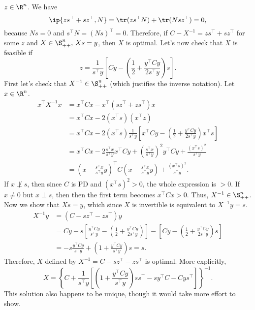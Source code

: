 \documentclass[../borwein-lewis_notes.tex]{subfiles}
\begin{document}
\begin{enumerate}[(a)]
{$z\in\R^n$. We have 
\begin{equation*}
\ip{zs^\top + sz^\top, N} = \tr(zs^\top N) + \tr(Nsz^\top) = 0,
\end{equation*}
because $Ns=0$ and $s^\top N = (Ns)^\top = 0$. Therefore, if 
$C-X^{-1} = zs^\top + sz^\top$ for some $z$ and $X\in\S_{++}^n,\,Xs=y$,
 then 
$X$ is optimal. Let's now check that $X$ is feasible if
\begin{equation*}
z = \frac{1}{s^\top y}\left[Cy - \left(\frac{1}{2}+\frac{y^\top Cy}{
2s^\top y}\right)s\right].
\end{equation*}
First let's check that $X^{-1}\in\S_{++}^n$ (which justifies the inverse
notation). Let $x\in\R^n$.
\begin{align*}
x^\top X^{-1} x &= x^\top Cx - x^\top(sz^\top +zs^\top)x \\
&= x^\top Cx - 2(x^\top s)(x^\top z)\\
&= x^\top Cx - 2(x^\top s)\frac{1}{s^\top y}\left[x^\top Cy - 
\left(\frac{1}{2}+\frac{y^\top Cy}{2s^\top y}\right)x^\top s\right]\\
&= x^\top Cx - 2\frac{s^\top x}{s^\top y} x^\top Cy + \left(\frac{s^\top x}{
s^\top y}\right)^2 y^\top C y  + \frac{(x^\top s)^2}{s^\top y} \\
&= \left(x-\frac{s^\top x}{s^\top y} y\right)^\top C
\left(x-\frac{s^\top x}{s^\top y} y\right) + \frac{(x^\top s)^2}{s^\top y}.
\end{align*}
If $x \not\perp s$, then since $C$ is PD and $(x^\top s)^2>0$, the 
whole expression is $>0$. If $x\neq 0$ but $x\perp s$, then then 
the first term becomes $x^\top C x > 0$. Thus, $X^{-1}\in\S_{++}^n$. \\
Now we show that $Xs = y$, which since $X$ is invertible is equivalent
to $X^{-1}y = s$. 
\begin{align*}
X^{-1}y &= (C - sz^\top - zs^\top)y \\
&= Cy - s\left[\frac{y^\top Cy}{s^\top y} - \left(\frac{1}{2}+\frac{
y^\top Cy}{2s^\top y}\right)\right]
- \left[Cy - \left(\frac{1}{2}+\frac{y^\top Cy}{2s^\top y}\right)s\right]\\
&= -s\frac{y^\top Cy}{s^\top y} + \left(1+\frac{y^\top Cy}{s^\top y}
\right)s = s.
\end{align*}
Therefore, $X$ defined by $X^{-1} = C-sz^\top - zs^\top$ is optimal.
More explicitly, 
\begin{equation*}
X = \left\{C + \frac{1}{s^\top y}\left[\left(1+\frac{y^\top Cy}{s^\top y}
\right)ss^\top - sy^\top C - Cys^\top\right]\right\}^{-1}.
\end{equation*}
This solution also happens to be unique, though it would take more 
effort to show.
}
\end{enumerate}
\end{document}

